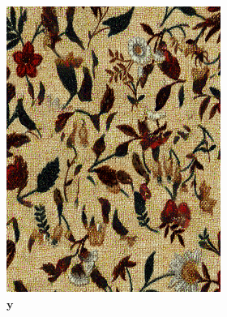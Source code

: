 \begin{figure}[]
    \begin{subfigure}{\textwidth}
        \centering
        \begin{subfigure}{0.24\textwidth}
            \centering
            \includegraphics[width=\textwidth]{images/04-experiment02/human/flowers2/target.jpg}
            \caption*{\(\bm{y}\)}
        \end{subfigure}
        \hfill
        \begin{subfigure}{0.24\textwidth}
            \centering

\end{subfigure}
\end{subfigure}
\end{figure}
